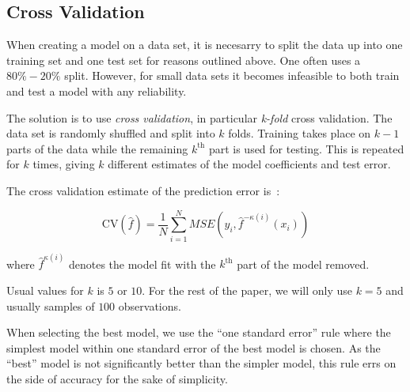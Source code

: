 \subsection{Cross Validation}
\label{sec:cv}

When creating a model on a data set, it is necesarry to split the data up
into one training set and one test set for reasons outlined above. One often
uses a \(80\% - 20\%\) split. However, for small data sets it becomes infeasible
to both train and test a model with any reliability.

The solution is to use \textit{cross validation}, in particular \textit{k-fold}
cross validation. The data set is randomly shuffled and split into \(k\) folds.
Training takes place on \(k-1\) parts of the data while the remaining
\(k^{\text{th}}\) part is used for testing. This is repeated for \(k\) times,
giving \(k\) different estimates of the model coefficients and test error.

The cross validation estimate of the prediction error is~\cite{statelem}:

\begin{equation*}
  \text{CV}(\hat f) = \frac{1}{N}\sum_{i=1}^{N}MSE(y_{i}, \hat f^{-\kappa(i)}(x_{i}))
\end{equation*}

where \(\hat f^{\kappa(i)}\) denotes the model fit with the \(k^{\text{th}}\)
part of the model removed.

Usual values for \(k\) is \(5\) or \(10\). For the rest of the paper, we will
only use \(k=5\) and usually samples of \(100\) observations. 

When selecting the best model, we use the ``one standard error'' rule where the
simplest model within one standard error of the best model is chosen. As the
``best'' model is not significantly better than the simpler model, this rule
errs on the side of accuracy for the sake of simplicity. 

